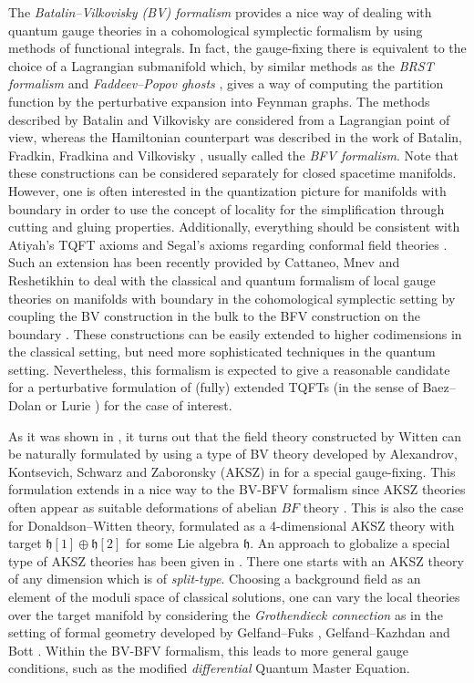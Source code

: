 \documentclass[11pt,colorinlistoftodos]{amsart}
\numberwithin{equation}{subsection}
\theoremstyle{plain}
\theoremstyle{definition}
\theoremstyle{remark}
\begin{document}
The \emph{Batalin--Vilkovisky (BV) formalism} \cite{BV1,BV2,BV3} provides a nice way of dealing with quantum gauge theories in a cohomological symplectic formalism \cite{KijowskiTulczyjew1979} by using methods of functional integrals. In fact, the gauge-fixing there is equivalent to the choice of a Lagrangian submanifold which, by similar methods as the \emph{BRST formalism} \cite{BRS1,BRS2,Tyutin1976} and \emph{Faddeev--Popov ghosts} \cite{FP}, gives a way of computing the partition function by the perturbative expansion into Feynman graphs. The methods described by Batalin and Vilkovisky are considered from a Lagrangian point of view, whereas the Hamiltonian counterpart was described in the work of Batalin, Fradkin, Fradkina and Vilkovisky \cite{BF1,BF2,FV1,FF}, usually called the \emph{BFV formalism}. Note that these constructions can be considered separately for closed spacetime manifolds. However, one is often interested in the quantization picture for manifolds with boundary in order to use the concept of locality for the simplification through cutting and gluing properties. Additionally, everything should be consistent with Atiyah's TQFT axioms and Segal's axioms regarding conformal field theories \cite{Segal1988}. Such an extension has been recently provided by Cattaneo, Mnev and Reshetikhin to deal with the classical and quantum formalism of local gauge theories on manifolds with boundary in the cohomological symplectic setting by coupling the BV construction in the bulk to the BFV construction on the boundary \cite{CMR1,CMR2}. These constructions can be easily extended to higher codimensions in the classical setting, but need more sophisticated techniques in the quantum setting. Nevertheless, this formalism is expected to give a reasonable candidate for a perturbative formulation of (fully) extended TQFTs (in the sense of Baez--Dolan \cite{BaezDolan1995} or Lurie \cite{Lurie2009}) for the case of interest. 

As it was shown in \cite{Ikeda2011}, it turns out that the field theory constructed by Witten can be naturally formulated by using a type of BV theory developed by Alexandrov, Kontsevich, Schwarz and Zaboronsky (AKSZ) in \cite{AKSZ} for a special gauge-fixing. This formulation extends in a nice way to the BV-BFV formalism since AKSZ theories often appear as suitable deformations of abelian $BF$ theory \cite{Mnev2019}. This is also the case for Donaldson--Witten theory, formulated as a 4-dimensional AKSZ theory with target $\mathfrak{h}[1]\oplus\mathfrak{h}[2]$ for some Lie algebra $\mathfrak{h}$. 
An approach to globalize a special type of AKSZ theories has been given in \cite{CMW3}. There one starts with an AKSZ theory of any dimension which is of \emph{split-type}. Choosing a background field as an element of the moduli space of classical solutions, one can vary the local theories over the target manifold by considering the \emph{Grothendieck connection} as in the setting of formal geometry developed by Gelfand--Fuks \cite{GelfandFuks1969,GelfandFuks1970}, Gelfand--Kazhdan \cite{GK} and Bott \cite{B}. Within the BV-BFV formalism, this leads to more general gauge conditions, such as the modified \emph{differential} Quantum Master Equation. 
\end{document}
